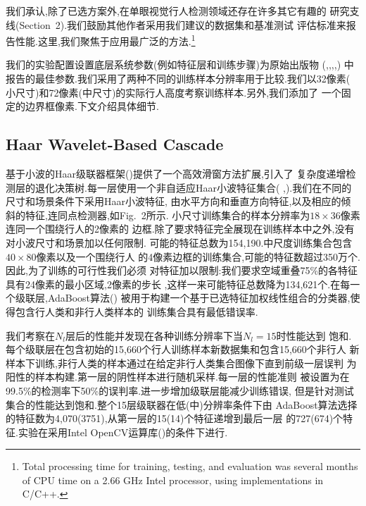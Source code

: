 \documentclass[10pt,letterpaper,journal,compsoc]{IEEEtran}
\begin{document}
我们承认,除了已选方案外,在单眼视觉行人检测领域还存在许多其它有趣的
研究支线(Section~2).我们鼓励其他作者采用我们建议的数据集和基准测试
评估标准来报告性能.这里,我们聚焦于应用最广泛的方法.\footnote{
Total processing time for training, testing, and evaluation was several
months of CPU time on a 2.66 GHz Intel processor, using implementations
in C/C++.}

我们的实验配置设置底层系统参数(例如特征层和训练步骤)为原始出版物
(\cite{bib11},\cite{bib23},\cite{bib49},\cite{bib74},\cite{bib75})
中报告的最佳参数.我们采用了两种不同的训练样本分辨率用于比较.我们以32像素(
小尺寸)和72像素(中尺寸)的实际行人高度考察训练样本.另外,我们添加了
一个固定的边界框像素.下文介绍具体细节.
\subsection{Haar Wavelet-Based Cascade}
基于小波的Haar级联器框架(\cite{bib74})提供了一个高效滑窗方法扩展,引入了
复杂度递增检测层的退化决策树.每一层使用一个非自适应Haar小波特征集合(
\cite{bib48},\cite{bib53}).我们在不同的尺寸和场景条件下采用Haar小波特征,
由水平方向和垂直方向特征,以及相应的倾斜的特征,连同点检测器,如Fig.~2所示.
小尺寸训练集合的样本分辨率为$18\times36$像素连同一个围绕行人的2像素的
边框.除了要求特征完全展现在训练样本中之外,没有对小波尺寸和场景加以任何限制.
可能的特征总数为154,190.中尺度训练集合包含$40\times80$像素以及一个围绕行人
的4像素边框的训练集合,可能的特征数超过350万个.因此,为了训练的可行性我们必须
对特征加以限制:我们要求空域重叠75\%的各特征具有24像素的最小区域,2像素的步长
,这样一来可能特征总数降为134,621个.在每一个级联层,AdaBoost算法(\cite{bib18})
被用于构建一个基于已选特征加权线性组合的分类器,使得包含行人类和非行人类样本的
训练集合具有最低错误率.

我们考察在$N_l$层后的性能并发现在各种训练分辨率下当$N_l=15$时性能达到
饱和.每个级联层在包含初始的15,660个行人训练样本新数据集和包含15,660个非行人
新样本下训练,非行人类的样本通过在给定非行人类集合图像下直到前级一层误判
为阳性的样本构建.第一层的阴性样本进行随机采样.每一层的性能准则
被设置为在99.5\%的检测率下50\%的误判率.进一步增加级联层能减少训练错误,
但是针对测试集合的性能达到饱和.整个15层级联器在低(中)分辨率条件下由
AdaBoost算法选择的特征数为4,070(3751),从第一层的15(14)个特征递增到最后一层
的727(674)个特征.实验在采用Intel OpenCV运算库(\cite{bib29})的条件下进行.
\end{document}
